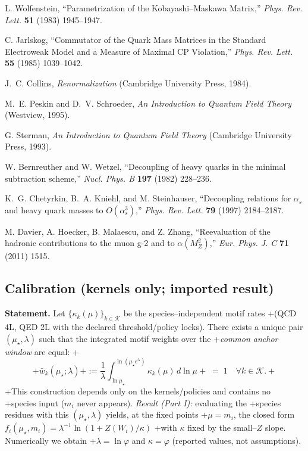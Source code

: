 \documentclass[epjc3]{svjour3}
\begin{document}
L. Wolfenstein, ``Parametrization of the Kobayashi–Maskawa Matrix,'' \emph{Phys. Rev. Lett.} \textbf{51} (1983) 1945–1947.

C. Jarlskog, ``Commutator of the Quark Mass Matrices in the Standard Electroweak Model and a Measure of Maximal CP Violation,'' \emph{Phys. Rev. Lett.} \textbf{55} (1985) 1039–1042.

J.~C. Collins, \emph{Renormalization} (Cambridge University Press, 1984).

M.~E. Peskin and D.~V. Schroeder, \emph{An Introduction to Quantum Field Theory} (Westview, 1995).

G. Sterman, \emph{An Introduction to Quantum Field Theory} (Cambridge University Press, 1993).

W. Bernreuther and W. Wetzel, ``Decoupling of heavy quarks in the minimal subtraction scheme,'' \emph{Nucl. Phys. B} \textbf{197} (1982) 228–236.

K.~G. Chetyrkin, B.~A. Kniehl, and M. Steinhauser, ``Decoupling relations for $\alpha_s$ and heavy quark masses to $O(\alpha_s^3)$,'' \emph{Phys. Rev. Lett.} \textbf{79} (1997) 2184–2187.

M. Davier, A. Hoecker, B. Malaescu, and Z. Zhang, ``Reevaluation of the hadronic contributions to the muon g-2 and to $\alpha(M_Z^2)$,'' \emph{Eur. Phys. J. C} \textbf{71} (2011) 1515.

\subsection*{Calibration (kernels only; imported result)}
\noindent\textbf{Statement.}
Let $\{\kappa_k(\mu)\}_{k\in\mathcal K}$ be the species–independent motif rates
+(QCD 4L, QED 2L with the declared threshold/policy locks). There exists a unique
pair $(\mu_\star,\lambda)$ such that the integrated motif weights over the
+\emph{common anchor window} are equal:
+\begin{equation}
+  \bar w_k(\mu_\star;\lambda)
+  := \frac{1}{\lambda}\int_{\ln\mu_\star}^{\ln(\mu_\star e^\lambda)}\!\!\kappa_k(\mu)\,d\ln\mu
+  \;=\;1\quad\forall k\in\mathcal K. \label{eq:anchor-window}
+\end{equation}
+This construction depends only on the kernels/policies and contains no
+species input ($m_i$ never appears). \emph{Result (Part I):} evaluating the
+species residues with this $(\mu_\star,\lambda)$ yields, at the fixed points
+$\mu=m_i$, the closed form $f_i(\mu_\star,m_i)=\lambda^{-1}\ln(1+Z(W_i)/\kappa)$
+with $\kappa$ fixed by the small–$Z$ slope. Numerically we obtain
+$\lambda=\ln\varphi$ and $\kappa=\varphi$ (reported values, not assumptions).
\end{document}

